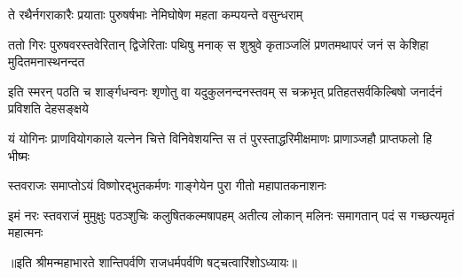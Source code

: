 \twolineshloka
{ते रथैर्नगराकारैः प्रयाताः पुरुषर्षभाः}
{नेमिघोषेण महता कम्पयन्ते वसुन्धराम्} %


\fourlineindentedshloka
{ततो गिरः पुरुषवरस्तवेरितान्}
{द्विजेरिताः पथिषु मनाक् स शुश्रुवे}
{कृताञ्जलिं प्रणतमथापरं जनं}
{स केशिहा मुदितमनास्थनन्दत} %


\fourlineindentedshloka
{इति स्मरन् पठति च शार्ङ्गधन्वनः}
{शृणोतु वा यदुकुलनन्दनस्तवम्}
{स चक्रभृत् प्रतिहतसर्वकिल्बिषो}
{जनार्दनं प्रविशति देहसङ्क्षये} %


\fourlineindentedshloka
{यं योगिनः प्राणवियोगकाले}
{यत्नेन चित्ते विनिवेशयन्ति}
{स तं पुरस्ताद्धरिमीक्षमाणः}
{प्राणाञ्जहौ प्राप्तफलो हि भीष्मः} %


\twolineshloka
{स्तवराजः समाप्तोऽयं विष्णोरद्भुतकर्मणः}
{गाङ्गेयेन पुरा गीतो महापातकनाशनः} %


\fourlineindentedshloka
{इमं नरः स्तवराजं मुमुक्षुः}
{पठञ्शुचिः कलुषितकल्मषापहम्}
{अतीत्य लोकान् मलिनः समागतान्}
{पदं स गच्छत्यमृतं महात्मनः} %

॥इति श्रीमन्महाभारते शान्तिपर्वणि राजधर्मपर्वणि षट्चत्वारिंशोऽध्यायः॥